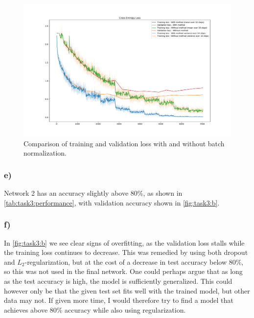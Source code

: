 \begin{figure}[h!]
  \centering
  \includegraphics[clip, trim = 0cm 0cm 0cm 0cm, width=\textwidth]{figures/Task3d-batch.pdf}
  \caption{Comparison of training and validation loss with and without batch normalization.}
  \label{fig:task3:d}
\end{figure}


\subsubsection*{e)}

Network 2 has an accuracy slightly above 80\%, as shown in \cref{tab:task3:performance}, with validation accuracy shown in \cref{fig:task3:b}.


\subsubsection*{f)}

In \cref{fig:task3:b} we see clear signs of overfitting, as the validation loss stalls while the training loss continues to decrease. This was remedied by using both dropout and $L_2$-regularization, but at the cost of a decrease in test accuracy below 80\%, so this was not used in the final network. One could perhaps argue that as long as the test accuracy is high, the model is sufficiently generalized. This could however only be that the given test set fits well with the trained model, but other data may not. If given more time, I would therefore try to find a model that achieves above 80\% accuracy while also using regularization. 
